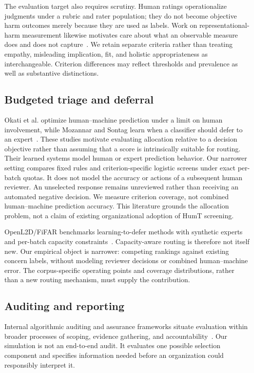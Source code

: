 \documentclass[manuscript,screen,review,anonymous]{acmart}
\begin{document}
The evaluation target also requires scrutiny. Human ratings operationalize judgments under a rubric and rater population; they do not become objective harm outcomes merely because they are used as labels. Work on representational-harm measurement likewise motivates care about what an observable measure does and does not capture~\cite{chien2024beyond}. We retain separate criteria rather than treating empathy, misleading implication, fit, and holistic appropriateness as interchangeable. Criterion differences may reflect thresholds and prevalence as well as substantive distinctions.

\subsection{Budgeted triage and deferral}
Okati et al. optimize human--machine prediction under a limit on human involvement, while Mozannar and Sontag learn when a classifier should defer to an expert~\cite{okati2021triage,mozannar2020defer}. These studies motivate evaluating allocation relative to a decision objective rather than assuming that a score is intrinsically suitable for routing. Their learned systems model human or expert prediction behavior. Our narrower setting compares fixed rules and criterion-specific logistic screens under exact per-batch quotas. It does not model the accuracy or actions of a subsequent human reviewer. An unselected response remains unreviewed rather than receiving an automated negative decision. We measure criterion coverage, not combined human--machine prediction accuracy. This literature grounds the allocation problem, not a claim of existing organizational adoption of HumT screening.

OpenL2D/FiFAR benchmarks learning-to-defer methods with synthetic experts and per-batch capacity constraints~\cite{alves2025openl2d}. Capacity-aware routing is therefore not itself new. Our empirical object is narrower: competing rankings against existing concern labels, without modeling reviewer decisions or combined human--machine error. The corpus-specific operating points and coverage distributions, rather than a new routing mechanism, must supply the contribution.

\subsection{Auditing and reporting}
Internal algorithmic auditing and assurance frameworks situate evaluation within broader processes of scoping, evidence gathering, and accountability~\cite{raji2020accountability,lam2024assurance}. Our simulation is not an end-to-end audit. It evaluates one possible selection component and specifies information needed before an organization could responsibly interpret it.
\end{document}
